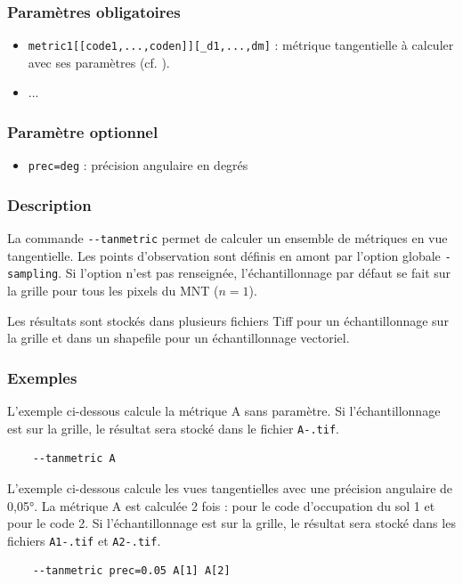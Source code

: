 \documentclass{report}
\begin{document}
\subsubsection{Paramètres obligatoires}
\begin{itemize}
	\item \verb|metric1[[code1,...,coden]][_d1,...,dm]| : métrique tangentielle à calculer avec ses paramètres (cf. ).
	\item ...
\end{itemize}

\subsubsection{Paramètre optionnel}
\begin{itemize}
	\item \verb|prec=deg| : précision angulaire en degrés
\end{itemize}

\subsubsection{Description}
La commande \verb|--tanmetric| permet de calculer un ensemble de métriques en vue tangentielle. Les points d'observation sont définis en amont par l'option globale \verb|-sampling|. Si l'option n'est pas renseignée, l'échantillonnage par défaut se fait sur la grille pour tous les pixels du MNT ($n=1$).

Les résultats sont stockés dans plusieurs fichiers Tiff pour un échantillonnage sur la grille et dans un shapefile pour un échantillonnage vectoriel.


\subsubsection{Exemples}

L'exemple ci-dessous calcule la métrique A sans paramètre. Si l'échantillonnage est sur la grille, le résultat sera stocké dans le fichier \verb|A-.tif|.
\begin{Verbatim}
	--tanmetric A
\end{Verbatim}

L'exemple ci-dessous calcule les vues tangentielles avec une précision angulaire de 0,05°. La métrique A est calculée 2 fois : pour le code d'occupation du sol 1 et pour le code 2. Si l'échantillonnage est sur la grille, le résultat sera stocké dans les fichiers \verb|A1-.tif| et \verb|A2-.tif|.
\begin{Verbatim}
	--tanmetric prec=0.05 A[1] A[2]
\end{Verbatim}
\end{document}
